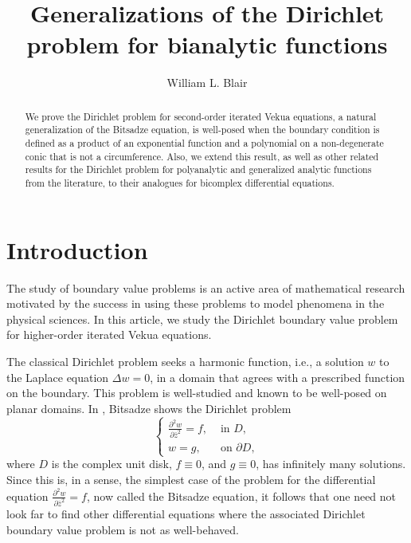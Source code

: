 \documentclass[12pt,reqno]{amsart}
\title{Generalizations of the Dirichlet problem for bianalytic functions}
\author{William L. Blair}
\theoremstyle{definition}
\theoremstyle{remark}
\newcommand{\p}{\partial}
\newcommand{\z}{\bar z}
\begin{document}
\begin{abstract}
    We prove the Dirichlet problem for second-order iterated Vekua equations, a natural generalization of the Bitsadze equation, is well-posed when the boundary condition is defined as a product of an exponential function and a polynomial on a non-degenerate conic that is not a circumference. Also, we extend this result, as well as other related results for the Dirichlet problem for polyanalytic and generalized analytic functions from the literature, to their analogues for bicomplex differential equations.  
\end{abstract}

\maketitle

\section{Introduction}\label{section: introduction}

    The study of boundary value problems is an active area of mathematical research motivated by the success in using these problems to model phenomena in the physical sciences. In this article, we study the Dirichlet boundary value problem for higher-order iterated Vekua equations. 

    The classical Dirichlet problem seeks a harmonic function, i.e., a solution $w$ to the Laplace equation $\Delta w = 0$, in a domain that agrees with a prescribed function on the boundary. This problem is well-studied and known to be well-posed on planar domains. In \cite{Bitsadze1948}, Bitsadze shows the Dirichlet problem 
    \begin{equation}\label{eq: dbvpintro}
        \begin{cases}
            \frac{\p^2 w}{\p\z^2} = f, & \text{ in } D,\\
            w = g, & \text{ on } \p D,
        \end{cases}
    \end{equation}
    where $D$ is the complex unit disk, $f\equiv 0$, and $g\equiv 0$, has infinitely many solutions. Since this is, in a sense, the simplest case of the problem for the differential equation $\frac{\p^2 w}{\p\z^2} = f$, now called the Bitsadze equation, it follows that one need not look far to find other differential equations where the associated Dirichlet boundary value problem is not as well-behaved. 
\end{document}
